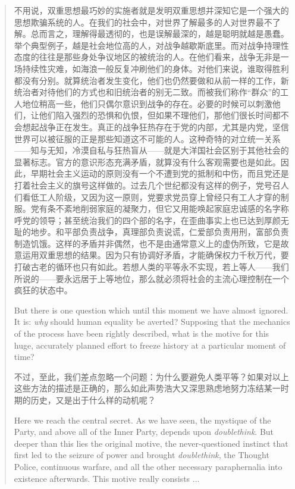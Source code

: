 \begin{paracol}{2}
\begin{quotation}
\switchcolumn

不用说，双重思想最巧妙的实施者就是发明双重思想并深知它是一个强大的思想欺骗系统的人。在我们的社会中，对世界了解最多的人对世界最不了解。总而言之，理解得最透彻的，也是误解最深的，越是聪明就越是愚蠢。举个典型例子，越是社会地位高的人，对战争越歇斯底里。而对战争持理性态度的往往是那些身处争议地区的被统治的人。在他们看来，战争无非是一场持续性灾难，如海浪一般反复冲刷他们的身体。对他们来说，谁取得胜利都没有分别。就算统治者发生变化，他们也仍然要做和从前一样的工作，新统治者对待他们的方式也和旧统治者的别无二致。而被我们称作``群众''的工人地位稍高一些，他们只偶尔意识到战争的存在。必要的时候可以刺激他们，让他们陷入强烈的恐惧和仇恨，但如果不理他们，那他们很长时间都不会想起战争正在发生。真正的战争狂热存在于党的内部，尤其是内党，坚信世界可以被征服的正是那些知道这不可能的人。这种奇特的对立统一关系——知与无知，冷漠自私与狂热盲从——就是大洋国社会区别于其他社会的显著标志。官方的意识形态充满矛盾，就算没有什么客观需要也是如此。因此，早期社会主义运动的原则没有一个不遭到党的抵制和中伤，而且党还是打着社会主义的旗号这样做的。过去几个世纪都没有这样的例子，党号召人们看低工人阶级，又因为这一原则，党要求党员穿上曾经只有工人才穿的制服。党有条不紊地削弱家庭的凝聚力，但它又用能唤起家庭忠诚感的名字称呼党的领导；甚至统治我们的四个部的名字，在歪曲事实上也已达到厚颜无耻的地步。和平部负责战争，真理部负责说谎，仁爱部负责用刑，富部负责制造饥饿。这样的矛盾并非偶然，也不是由通常意义上的虚伪所致，它是故意运用双重思想的结果。因为只有协调好矛盾，才能确保权力千秋万代，要打破古老的循环也只有如此。若想人类的平等永不实现，若上等人——我们所说的——要永远居于上等地位，那么就必须将社会的主流心理控制在一个疯狂的状态中。

\switchcolumn*

But there is one question which until this moment we have almost
ignored. It is: \emph{why} should human equality be averted? Supposing
that the mechanics of the process have been rightly described, what is
the motive for this huge, accurately planned effort to freeze history at
a particular moment of time?

\switchcolumn

不过，至此，我们差点忽略一个问题：为什么要避免人类平等？如果对以上这些方法的描述是正确的，那么如此声势浩大又深思熟虑地努力冻结某一时期的历史，又是出于什么样的动机呢？

\switchcolumn*

Here we reach the central secret. As we have seen, the mystique of the
Party, and above all of the Inner Party, depends upon
\emph{doublethink}. But deeper than this lies the original motive, the
never-questioned instinct that first led to the seizure of power and
brought \emph{doublethink}, the Thought Police, continuous warfare, and
all the other necessary paraphernalia into existence afterwards. This
motive really consists ...
\end{quotation}


\end{paracol}
